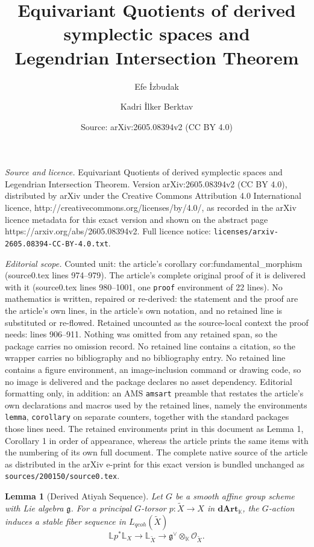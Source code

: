 \documentclass[10pt,a4paper]{amsart}
\title{Equivariant Quotients of derived symplectic spaces and \\ Legendrian Intersection Theorem}
\author{Efe \.{I}zbudak \and Kadri \.{I}lker Berktav}
\date{Source: arXiv:2605.08394v2 (CC BY 4.0)}
\newtheorem{lemma}{Lemma}
\newcommand{\K}{\mathbb{K}}
\newcommand{\LL}{\mathbb{L}}
\newcommand{\cO}{\mathcal{O}}
\newcommand{\dArt}{\mathbf{dArt}}
\begin{document}
\maketitle

\noindent\emph{Source and licence.} Equivariant Quotients of derived symplectic spaces and \\ Legendrian Intersection Theorem. Version arXiv:2605.08394v2 (CC BY 4.0), distributed by arXiv under the Creative Commons Attribution 4.0 International licence, http://creativecommons.org/licenses/by/4.0/, as recorded in the arXiv licence metadata for this exact version and shown on the abstract page https://arxiv.org/abs/2605.08394v2. Full licence notice: \texttt{licenses/arxiv-2605.08394-CC-BY-4.0.txt}.\par\smallskip

\noindent\textit{Editorial scope.} Counted unit: the article's corollary cor:fundamental\_morphism (source0.tex lines 974--979). The article's complete original proof of it is delivered with it (source0.tex lines 980--1001, one \texttt{proof} environment of 22 lines). No mathematics is written, repaired or re-derived: the statement and the proof are the article's own lines, in the article's own notation, and no retained line is substituted or re-flowed.  Retained uncounted as the source-local context the proof needs: lines 906--911.  Nothing was omitted from any retained span, so the package carries no omission record.  No retained line contains a citation, so the wrapper carries no bibliography and no bibliography entry.  No retained line contains a figure environment, an image-inclusion command or drawing code, so no image is delivered and the package declares no asset dependency.  Editorial formatting only, in addition: an AMS \texttt{amsart} preamble that restates the article's own declarations and macros used by the retained lines, namely the environments \texttt{lemma}, \texttt{corollary} on separate counters, together with the standard packages those lines need.  The retained environments print in this document as Lemma 1, Corollary 1 in order of appearance, whereas the article prints the same items with the numbering of its own full document.  The complete native source of the article as distributed in the arXiv e-print for this exact version is bundled unchanged as \texttt{sources/200150/source0.tex}.
\begin{lemma}[Derived Atiyah Sequence] \label{lem:atiyah}
  Let $G$ be a smooth affine group scheme with Lie algebra $\mathfrak{g}$. For a principal $G$-torsor $p \colon \widetilde{X} \to X$ in $\dArt_\K$, the $G$-action induces a stable fiber sequence in $L_{qcoh}(\widetilde{X})$
  \begin{equation*}
    \mathbb{L}p^*\LL_{X} \to \LL_{\widetilde{X}} \to \mathfrak{g}^\vee \otimes_\K \cO_{\widetilde{X}}.
  \end{equation*}
\end{lemma}
\end{document}
